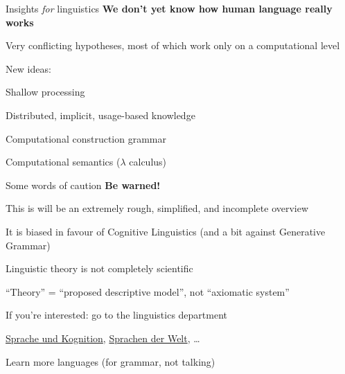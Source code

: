 \documentclass[aspectratio=169,cramped]{beamer}
\let\tempone\itemize
\let\temptwo\enditemize
\renewenvironment{itemize}{\tempone\addtolength{\itemsep}{-0\baselineskip}\addtolength{\parskip}{-0.2\baselineskip}}{\temptwo}
\begin{document}
\begin{frame}{Insights \textit{for} linguistics}
	\textbf{We don't yet know how human language really works}
	\begin{itemize}
  \item Very conflicting hypotheses, most of which work only on a computational level
  \item New ideas:
    \begin{itemize}
    \item Shallow processing
    \item Distributed, implicit, usage-based knowledge
    \item Computational construction grammar
    \item Computational semantics (\(\lambda\) calculus)
    \end{itemize}
  \end{itemize}
\end{frame}

\begin{frame}{Some words of caution}
  \textbf{Be warned!}
  \begin{itemize}
  \item This is will be an extremely rough, simplified, and incomplete overview
  \item It is biased in favour of Cognitive Linguistics (and a bit against Generative Grammar)
  \item Linguistic theory is not completely scientific
    \begin{itemize}
    \item ``Theory'' = ``proposed descriptive model'', not ``axiomatic system''
    \end{itemize}
  \item If you're interested: go to the linguistics department
    \begin{itemize}
    \item
      \href{https://online.uni-graz.at/kfu_online/wbLv.wbShowLVDetail?pStpSpNr=584778}{Sprache und Kognition}, \href{https://online.uni-graz.at/kfu_online/wbLv.wbShowLVDetail?pStpSpNr=582944&pSpracheNr=1}{Sprachen
      der Welt}, \ldots
    \item Learn more languages (for grammar, not talking)
    \end{itemize}
  \end{itemize}
\end{frame}

\end{document}
